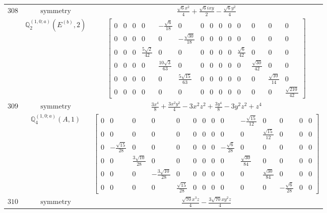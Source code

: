 \documentclass[fleqn,8pt,landscape]{jsarticle}
\begin{document}
\begin{longtable}{ccc}
$ 308 $ & $ \text{symmetry} $ & $ \frac{\sqrt{6} x^{2}}{4} + \frac{\sqrt{6} i x y}{2} - \frac{\sqrt{6} y^{2}}{4} $ \\
$  $ & $ \mathbb{Q}_{2}^{(1,0;a)}(E^{(b)},2) $ & $ \begin{bmatrix} 0 & 0 & 0 & 0 & - \frac{\sqrt{6}}{18} & 0 & 0 & 0 & 0 & 0 & 0 & 0 & 0 & 0 \\ 0 & 0 & 0 & 0 & 0 & - \frac{\sqrt{30}}{18} & 0 & 0 & 0 & 0 & 0 & 0 & 0 & 0 \\ 0 & 0 & 0 & \frac{5 \sqrt{2}}{42} & 0 & 0 & 0 & 0 & 0 & 0 & \frac{\sqrt{6}}{42} & 0 & 0 & 0 \\ 0 & 0 & 0 & 0 & \frac{10 \sqrt{3}}{63} & 0 & 0 & 0 & 0 & 0 & 0 & \frac{\sqrt{30}}{42} & 0 & 0 \\ 0 & 0 & 0 & 0 & 0 & \frac{5 \sqrt{15}}{63} & 0 & 0 & 0 & 0 & 0 & 0 & \frac{\sqrt{10}}{14} & 0 \\ 0 & 0 & 0 & 0 & 0 & 0 & 0 & 0 & 0 & 0 & 0 & 0 & 0 & \frac{\sqrt{210}}{42} \end{bmatrix} $ \\ \hline
$ 309 $ & $ \text{symmetry} $ & $ \frac{3 x^{4}}{8} + \frac{3 x^{2} y^{2}}{4} - 3 x^{2} z^{2} + \frac{3 y^{4}}{8} - 3 y^{2} z^{2} + z^{4} $ \\
$  $ & $ \mathbb{Q}_{4}^{(1,0;a)}(A,1) $ & $ \begin{bmatrix} 0 & 0 & 0 & 0 & 0 & 0 & 0 & 0 & 0 & - \frac{\sqrt{15}}{12} & 0 & 0 & 0 & 0 \\ 0 & 0 & 0 & 0 & 0 & 0 & 0 & 0 & 0 & 0 & \frac{\sqrt{15}}{12} & 0 & 0 & 0 \\ 0 & - \frac{\sqrt{15}}{28} & 0 & 0 & 0 & 0 & 0 & 0 & - \frac{\sqrt{6}}{28} & 0 & 0 & 0 & 0 & 0 \\ 0 & 0 & \frac{3 \sqrt{10}}{28} & 0 & 0 & 0 & 0 & 0 & 0 & \frac{\sqrt{30}}{84} & 0 & 0 & 0 & 0 \\ 0 & 0 & 0 & - \frac{3 \sqrt{10}}{28} & 0 & 0 & 0 & 0 & 0 & 0 & \frac{\sqrt{30}}{84} & 0 & 0 & 0 \\ 0 & 0 & 0 & 0 & \frac{\sqrt{15}}{28} & 0 & 0 & 0 & 0 & 0 & 0 & - \frac{\sqrt{6}}{28} & 0 & 0 \end{bmatrix} $ \\ \hline
$ 310 $ & $ \text{symmetry} $ & $ \frac{\sqrt{70} x^{3} z}{4} - \frac{3 \sqrt{70} x y^{2} z}{4} $ \\

\end{longtable}
\end{document}
